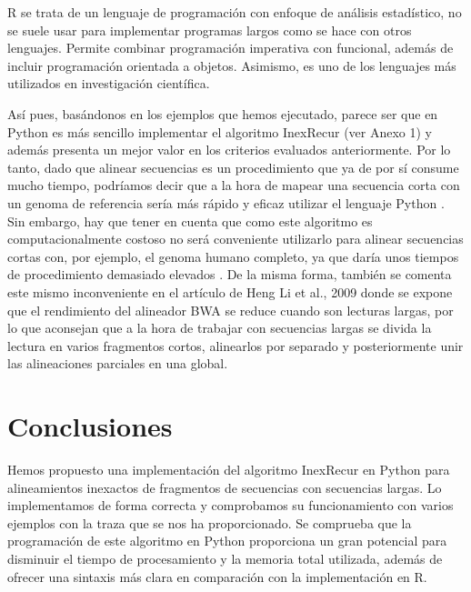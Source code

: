 \documentclass{article}
\begin{document}
R se trata de un lenguaje de  programación  con  enfoque  de  análisis
estadístico, no se suele usar para implementar programas  largos  como
se hace con otros lenguajes.  Permite combinar programación imperativa
con funcional, además de incluir  programación	orientada  a  objetos.
Asimismo, es uno de los  lenguajes  más  utilizados  en  investigación
científica. \cite{bellosta_2018,kleiber_zeileis_2008}

Así pues, basándonos en los ejemplos que hemos ejecutado,  parece  ser
que en Python es más sencillo implementar el algoritmo InexRecur  (ver
Anexo 1) y además presenta un mejor valor en los  criterios  evaluados
anteriormente.	Por lo	tanto,	dado  que  alinear  secuencias	es  un
procedimiento que ya de por sí consume mucho tiempo,  podríamos  decir
que a la  hora	de  mapear  una  secuencia  corta  con	un  genoma  de
referencia sería más rápido  y	eficaz	utilizar  el  lenguaje	Python
\cite{amigo_2015}.  Sin embargo, hay que tener en cuenta que como este
algoritmo es computacionalmente costoso no será conveniente utilizarlo
para alinear secuencias cortas con,  por  ejemplo,  el	genoma	humano
completo,  ya  que  daría  unos  tiempos  de  procedimiento  demasiado
elevados \cite{Houtgast2015}.  De la misma forma, también  se  comenta
este mismo inconveniente en el	artículo  de  Heng  Li	et  al.,  2009
\cite{li_durbin_2009} donde se expone que el rendimiento del alineador
BWA se reduce cuando son lecturas largas, por lo que aconsejan	que  a
la hora de trabajar con secuencias largas  se  divida  la  lectura  en
varios fragmentos cortos, alinearlos  por  separado  y	posteriormente
unir las alineaciones parciales en una global.

\vspace{-1cm}
\section{Conclusiones}
\vspace{-0.25cm}

Hemos propuesto una implementación del algoritmo InexRecur  en	Python
para  alineamientos  inexactos	de  fragmentos	 de   secuencias   con
secuencias largas. Lo implementamos de forma correcta y comprobamos su
funcionamiento con  varios  ejemplos  con  la  traza  que  se  nos  ha
proporcionado.	Se comprueba que la programación de este algoritmo  en
Python proporciona un gran  potencial  para  disminuir	el  tiempo  de
procesamiento y la memoria total  utilizada,  además  de  ofrecer  una
sintaxis  más  clara  en  comparación  con  la	implementación	en  R.
\end{document}
